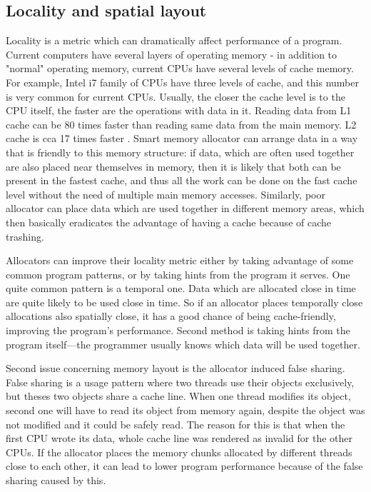\subsection{Locality and spatial layout}

Locality is a metric which can dramatically affect performance of a program.
Current computers have several layers of operating memory - in addition to
"normal" operating memory, current CPUs have several levels of cache memory. For
example, Intel i7 family of CPUs have three levels of cache, and this number is
very common for current CPUs. Usually, the closer the cache level is to the CPU
itself, the faster are the operations with data in it. Reading data from L1 cache
can be 80 times faster than reading same data from the main memory. L2 cache is
cca 17 times faster \cite{drepper-memory}. Smart memory allocator can arrange
data in a way that is friendly to this memory structure: if data, which are often
used together are also placed near themselves in memory, then it is likely that
both can be present in the fastest cache, and thus all the work can be done on
the fast cache level without the need of multiple main memory accesses.
Similarly, poor allocator can place data which are used together in different
memory areas, which then basically eradicates the advantage of having a cache
because of cache trashing.

Allocators can improve their locality metric either by taking advantage of some
common program patterns, or by taking hints from the program it serves. One quite
common pattern is a temporal one. Data which are allocated close in time are
quite likely to be used close in time. So if an allocator places temporally close
allocations also spatially close, it has a good chance of being cache-friendly,
improving the program's performance. Second method is taking hints from the
program itself---the programmer usually knows which data will be used together.

Second issue concerning memory layout is the allocator induced false sharing.
False sharing is a usage pattern where two threads use their objects exclusively,
but theses two objects share a cache line. When one thread modifies its object,
second one will have to read its object from memory again, despite the object was
not modified and it could be safely read. The reason for this is that when the
first CPU wrote its data, whole cache line was rendered as invalid for the other
CPUs. If the allocator places the memory chunks allocated by different threads
close to each other, it can lead to lower program performance because of the
false sharing caused by this.

